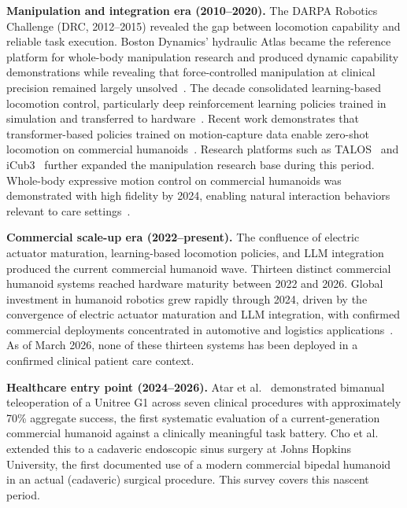 \textbf{Manipulation and integration era (2010--2020).} The DARPA Robotics
Challenge (DRC, 2012--2015) revealed the gap between locomotion capability and
reliable task execution. Boston Dynamics' hydraulic Atlas became the reference
platform for whole-body manipulation research and produced dynamic capability
demonstrations while revealing that force-controlled manipulation at clinical
precision remained largely unsolved~\cite{cao2025humanoid}. The decade
consolidated learning-based locomotion control, particularly deep reinforcement
learning policies trained in simulation and transferred to
hardware~\cite{duan2022simtoreal,radosavovic2024realworld}. Recent work
demonstrates that transformer-based policies trained on motion-capture data
enable zero-shot locomotion on commercial
humanoids~\cite{radosavovic2024humanoid}. Research platforms such as
TALOS~\cite{stasse2017talos} and iCub3~\cite{dafarra2024icub3} further expanded
the manipulation research base during this period.
Whole-body expressive motion control on commercial humanoids was demonstrated with high fidelity by 2024, enabling
natural interaction behaviors relevant to care
settings~\cite{cheng2024expressive}.

\textbf{Commercial scale-up era (2022--present).} The confluence of electric
actuator maturation, learning-based locomotion policies, and LLM integration
produced the current commercial humanoid wave. Thirteen distinct commercial
humanoid systems reached hardware maturity between 2022 and 2026. Global
investment in humanoid robotics grew rapidly through 2024, driven by the
convergence of electric actuator maturation and LLM integration, with confirmed
commercial deployments concentrated in automotive and logistics
applications~\cite{goldmansachs2024humanoid,ifr2025humanoid}.
As
of March 2026, none of these thirteen systems has been deployed in a confirmed
clinical patient care context.

\textbf{Healthcare entry point (2024--2026).} Atar et al.~\cite{atar2025humanoids}
demonstrated bimanual teleoperation of a Unitree G1 across seven clinical
procedures with approximately 70\% aggregate success, the first systematic
evaluation of a current-generation commercial humanoid against a clinically
meaningful task battery. Cho et al.~\cite{cho2026humanoid} extended this to a
cadaveric endoscopic sinus surgery at Johns Hopkins University, the first
documented use of a modern commercial bipedal humanoid in an actual (cadaveric)
surgical procedure. This survey covers this nascent period.


